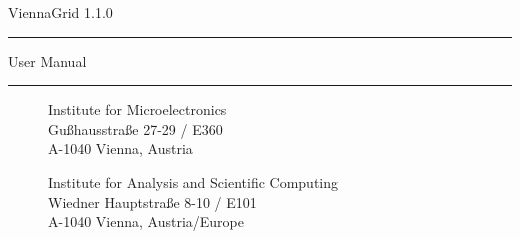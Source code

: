
\begin{titlepage}

\vspace*{3cm}
\Huge{ViennaGrid 1.1.0}
\rule[0.0cm]{8.9cm}{0.05cm}
\begin{flushright}
\Large{User Manual}
\end{flushright}

\vspace{11.2cm}
\rule[0.0cm]{16.0cm}{0.05cm}
\begin{figure}[!ht]
   \vspace{-1.0cm}
   \begin{minipage}{2cm}
   \end{minipage}
   \hfill
   \begin{minipage}{9.5cm}
      \begin{flushright}
      \vspace{0.2cm}
      Institute for Microelectronics\\
      Gu\ss hausstra\ss e 27-29 / E360\\
      A-1040 Vienna, Austria\\
      \end{flushright}
      \vspace{0.1cm}
      \begin{flushright}
      Institute for Analysis and Scientific Computing\\
      Wiedner Hauptstra\ss e 8-10 / E101\\
      A-1040 Vienna, Austria/Europe\\
      \end{flushright}
   \end{minipage}
   \hfill
   \begin{minipage}{2.6cm}
       \\
      \hspace*{0.3cm}
   \end{minipage}
\end{figure}

\end{titlepage}


